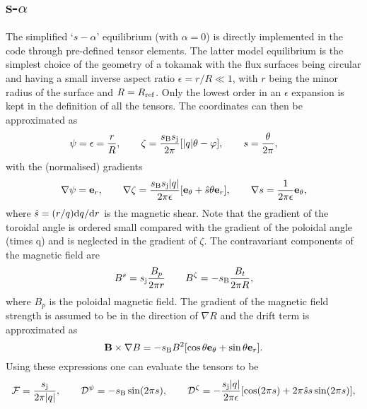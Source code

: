 \subsection{\texorpdfstring{s-$\alpha$}{s-alpha}}
The simplified `$s-\alpha$' equilibrium (with $\alpha=0$) is directly implemented in the code through pre-defined tensor elements. 
The latter model equilibrium is the simplest choice of the geometry of a tokamak with the flux surfaces being 
circular and having a small inverse aspect ratio $\epsilon = r / R \ll 1$, with $r$ being the 
minor radius of the surface and $R=R_{\rm ref}$.  
Only the lowest order in an $\epsilon$ expansion is kept in the definition of all the tensors. 
The coordinates can then be approximated as 
\begin{equation} 
\psi = \epsilon = {r \over R}, \qquad 
\zeta =  {s_{\rm B} s_{\rm j} \over 2 \pi} [|q| \theta - \varphi ], \qquad 
s = {\theta \over 2 \pi },  \qquad
\end{equation}
with the (normalised) gradients  
\begin{equation} 
\nabla \psi = {\bf e}_r, \qquad 
\nabla \zeta = {s_{\rm B} s_{\rm j} |q| \over 2 \pi \epsilon} [ {\bf e}_\theta + \hat s \theta {\bf e}_r ],  \qquad 
\nabla s = {1 \over 2 \pi \epsilon} {\bf e}_\theta , 
\end{equation} 
where $\hat s = ({r / q}) {\rm d} q / {\rm d} r$ is the magnetic shear. 
Note that the gradient of the toroidal angle is ordered small compared with the gradient of the poloidal
angle (times q) and is neglected in the gradient of $\zeta$. The contravariant components of the 
magnetic field are 
\begin{equation} 
B^s = s_{\rm j}{B_p \over 2 \pi r} \qquad 
B^\zeta = -s_{\rm B}{B_t \over 2 \pi R} , 
\end{equation} 
where $B_p$ is the poloidal magnetic field. 
The gradient of the magnetic field strength is assumed to be in the direction of $\nabla R$ and the 
drift term is approximated as 
\begin{equation} 
{\bf B} \times \nabla B = -s_{\rm B}B^2 [ \cos \theta {\bf e}_\theta + \sin \theta {\bf e}_r ] .
\end{equation} 
Using these expressions one can evaluate the tensors to be 
\begin{equation} 
{\cal F} = {s_{\rm j}\over 2 \pi |q|},  \qquad  
{\cal D^\psi} = - s_{\rm B} \sin (2 \pi s), \qquad
{\cal D}^\zeta = - {s_{\rm j}|q| \over 2 \pi \epsilon } [ \cos (2 \pi s) + 2 \pi \hat s s \sin (2 \pi s) ] ,
\end{equation}
